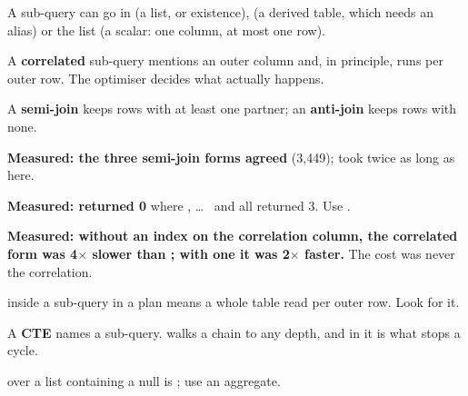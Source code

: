 \begin{chaptersummary}
\begin{tight}
  \item A sub-query can go in  (a list, or existence),
         (a derived table, which needs an alias) or the
         list (a scalar: one column, at most one row).
  \item A \textbf{correlated} sub-query mentions an outer column and, in
        principle, runs per outer row. The optimiser decides what actually
        happens.
  \item A \textbf{semi-join} keeps rows with at least one partner; an
        \textbf{anti-join} keeps rows with none.
  \item \textbf{Measured: the three semi-join forms agreed} (3{,}449);
         took twice as long as  here.
  \item \textbf{Measured:  returned 0} where ,  \dots\  and 
        all returned 3. Use .
  \item \textbf{Measured: without an index on the correlation column, the
        correlated form was 4$\times$ slower than ; with one
        it was 2$\times$ faster.} The cost was never the correlation.
  \item {} inside a  sub-query in a plan means a
        whole table read per outer row. Look for it.
  \item A \textbf{CTE} names a sub-query.  walks a chain
        to any depth, and  in it is what stops a cycle.
  \item {} over a list containing a null is \unk{}; use an
        aggregate.
\end{tight}
\end{chaptersummary}

